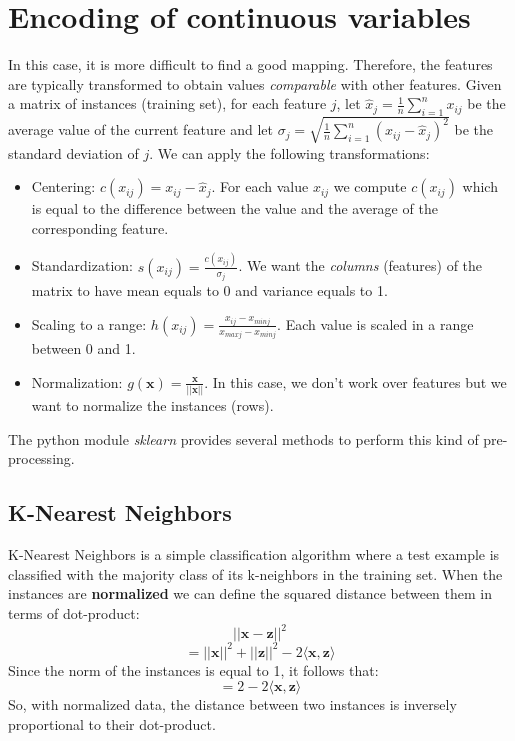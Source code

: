 \section{Encoding of continuous variables}
In this case, it is more difficult to find a good mapping. Therefore, the features are typically transformed to obtain values \textit{comparable} with other features.\newline\newline
Given a matrix of instances (training set), for each feature $j$, let $\hat{x}_{j} = \frac{1}{n}\sum_{i=1}^{n}x_{ij}$ be the average value of the current feature and let $\sigma_{j} = \sqrt{\frac{1}{n}\sum_{i=1}^{n}(x_{ij} - \hat{x}_{j})^{2}}$ be the standard deviation of $j$. We can apply the following transformations:
\begin{itemize}
    \item Centering: $c(x_{ij}) = x_{ij} - \hat{x}_{j}$. For each value $x_{ij}$ we compute $c(x_{ij})$ which is equal to the difference between the value and the average of the corresponding feature.

    \item Standardization: $s(x_{ij}) = \frac{c(x_{ij})}{\sigma_{j}}$. We want the \textit{columns} (features) of the matrix to have mean equals to 0 and variance equals to 1.

    \item Scaling to a range: $h(x_{ij}) = \frac{x_{ij} - x_{min j}}{x_{max j} - x_{min j}}$. Each value is scaled in a range between 0 and 1.

    \item Normalization: $g(\textbf{x}) = \frac{\textbf{x}}{||\textbf{x}||}$. In this case, we don't work over features but we want to normalize the instances (rows).
\end{itemize}
The python module \textit{sklearn} provides several methods to perform this kind of pre-processing.

\subsection{K-Nearest Neighbors}
K-Nearest Neighbors is a simple classification algorithm where a test example is classified with the majority class of its k-neighbors in the training set.\newline\newline
When the instances are \textbf{normalized} we can define the squared distance between them in terms of dot-product:
\[||\textbf{x} - \textbf{z}||^{2}\]
\[= ||\textbf{x}||^{2} + ||\textbf{z}||^{2} - 2\langle \textbf{x}, \textbf{z}  \rangle\]
Since the norm of the instances is equal to 1, it follows that:
\[= 2 - 2\langle \textbf{x}, \textbf{z}  \rangle\]
So, with normalized data, the distance between two instances is inversely proportional to their dot-product.

